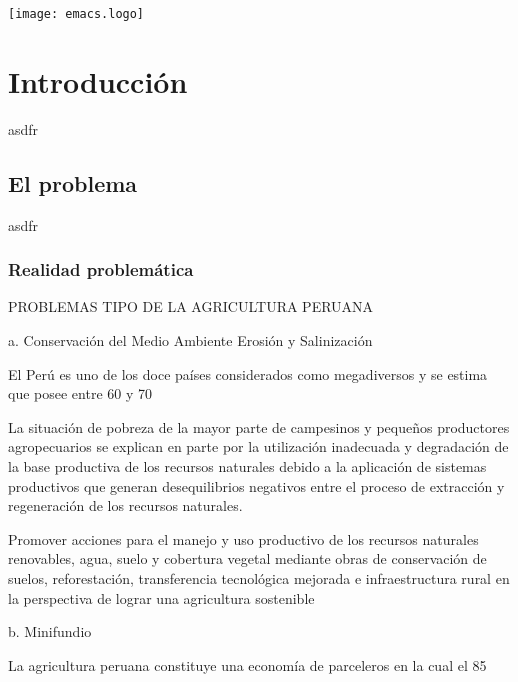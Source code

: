 \documentclass{report}
\title{}
\author{Llaksa}
\date{\today}
\begin{document}
\maketitle
\texttt{[image: emacs.logo]}
\tableofcontents
\newpage
{}

\chapter{Introducción}
asdfr
\section{El problema}
asdfr
\subsection{Realidad problemática}
PROBLEMAS TIPO DE LA AGRICULTURA PERUANA

a. Conservación del Medio Ambiente Erosión y Salinización

El Perú es uno de los doce países considerados como megadiversos y se estima que posee entre 60 y 70%

La situación de pobreza de la mayor parte de campesinos y pequeños productores agropecuarios se explican en parte por la utilización inadecuada y degradación de la base productiva de los recursos naturales debido a la aplicación de sistemas productivos que generan desequilibrios negativos entre el proceso de extracción y regeneración de los recursos naturales.

Promover acciones para el manejo y uso productivo de los recursos naturales renovables, agua, suelo y cobertura vegetal mediante obras de conservación de suelos, reforestación, transferencia tecnológica mejorada e infraestructura rural en la perspectiva de lograr una agricultura sostenible

b. Minifundio

La agricultura peruana constituye una economía de parceleros en la cual el 85%
\end{document}

